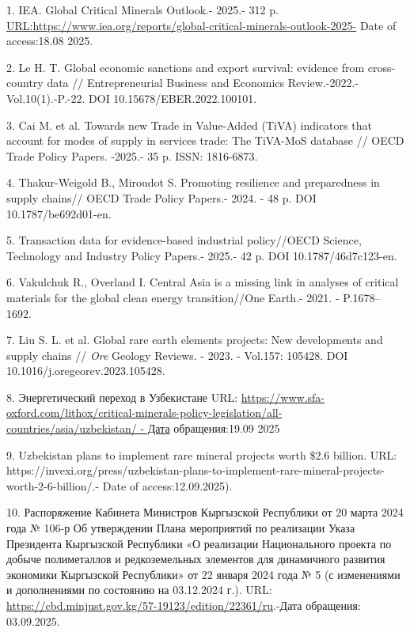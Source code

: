 \begin{refs}
1. IEA. Global Critical Minerals Outlook.- 2025.- 312 p.
\url{URL:https://www.iea.org/reports/global-critical-minerals-outlook-2025-}
Date of access:18.08 2025.

2. Le H. T. Global economic sanctions and export survival: evidence from
cross-country data // Entrepreneurial Business and Economics
Review.-2022.-Vol.10(1).-P.-22. DOI 10.15678/EBER.2022.100101.

3. Cai M. et al. Towards new Trade in Value-Added (TiVA) indicators that
account for modes of supply in services trade: The TiVA-MoS database //
OECD Trade Policy Papers. -2025.- 35 p. ISSN: 1816-6873.

4. Thakur-Weigold B., Miroudot S. Promoting resilience and preparedness
in supply chains// OECD Trade Policy Papers.- 2024. - 48 p. DOI
10.1787/be692d01-en.

5. Transaction data for evidence-based industrial policy//OECD Science,
Technology and Industry Policy Papers.- 2025.- 42 p. DOI
10.1787/46d7c123-en.

6. Vakulchuk R., Overland I. Central Asia is a missing link in analyses
of critical materials for the global clean energy transition//One
Earth.- 2021. - P.1678--1692.

7. Liu S. L. et al. Global rare earth elements projects: New
developments and supply chains // \emph{Ore} Geology Reviews. - 2023. -
Vol.157: 105428. DOI 10.1016/j.oregeorev.2023.105428.

8. Энергетический переход в Узбекистане URL:
\href{https://www.sfa-oxford.com/lithox/critical-minerals-policy-legislation/all-countries/asia/uzbekistan/\%20-\%20Дата}{https://www.sfa-oxford.com/lithox/critical-minerals-policy-legislation/all-countries/asia/uzbekistan/
- Дата} обращения:19.09 2025

9. Uzbekistan plans to implement rare mineral projects worth \$2.6
billion. URL:
https://invexi.org/press/uzbekistan-plans-to-implement-rare-mineral-projects-worth-2-6-billion/.-
Date of access:12.09.2025).

10. Распоряжение Кабинета Министров Кыргызской Республики от 20 марта
2024 года № 106-р Об утверждении Плана мероприятий по реализации Указа
Президента Кыргызской Республики «О реализации Национального проекта по
добыче полиметаллов и редкоземельных элементов для динамичного развития
экономики Кыргызской Республики» от 22 января 2024 года № 5 (с
изменениями и дополнениями по состоянию на 03.12.2024 г.). URL:
\url{https://cbd.minjust.gov.kg/57-19123/edition/22361/ru}.-Дата
обращения: 03.09.2025.


\end{refs}
